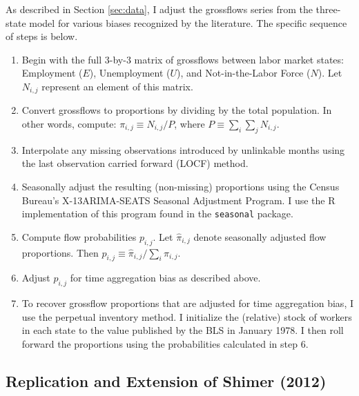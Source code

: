 \documentclass[12pt]{article}
\begin{document}
As described in Section \ref{sec:data}, I adjust the grossflows series from the three-state model for various biases recognized by the literature. The specific sequence of steps is below.
\begin{enumerate}
\item Begin with the full 3-by-3 matrix of grossflows between labor market states: Employment ($E$), Unemployment ($U$), and Not-in-the-Labor Force ($N$). Let $N_{i,j}$ represent an element of this matrix.
\item Convert grossflows to proportions by dividing by the total population. In other words, compute: $\pi_{i,j} \equiv N_{i,j} / P$, where $P \equiv \sum_i \sum_j N_{i,j}$.
\item Interpolate any missing observations introduced by unlinkable months using the last observation carried forward (LOCF) method.
\item Seasonally adjust the resulting (non-missing) proportions using the Census Bureau's X-13ARIMA-SEATS Seasonal Adjustment Program. I use the R implementation of this program found in the \texttt{seasonal} package.
\item Compute flow probabilities $p_{i,j}$. Let $\hat \pi_{i,j}$ denote seasonally adjusted flow proportions. Then $p_{i,j} \equiv \hat\pi_{i,j} / \sum_i{\hat\pi_{i,j}}$.
\item Adjust $p_{i,j}$ for time aggregation bias as described above.
\item To recover grossflow proportions that are adjusted for time aggregation bias, I use the perpetual inventory method. I initialize the (relative) stock of workers in each state to the value published by the BLS in January 1978. I then roll forward the proportions using the probabilities calculated in step 6. 
\end{enumerate}

\subsection{Replication and Extension of Shimer (2012)}\label{app:sec:shimer_replication}
\end{document}
